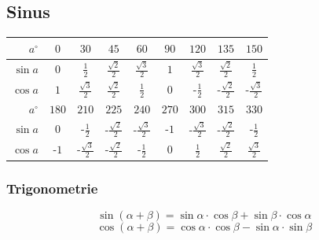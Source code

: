 \documentclass[8pt,a4paper,landscape]{scrartcl}
\begin{document}
\begin{multicols*}{3}
\subsection*{Sinus}
\begin{tabularx}{\columnwidth}{r|c|c|c|c|c|c|c|c|}
	$ a^\circ $ & $ 0 $ & $ 30 $ & $ 45 $ & $ 60 $ & $ 90 $ & $ 120 $ & $ 135 $ & $ 150 $ \\ \hline
	$ \sin a$& $ 0 $& $ \frac{1}{2} $& $ \frac{\sqrt{2}}{2} $& $ \frac{\sqrt{3}}{2} $& $ 1 $& $ \frac{\sqrt{3}}{2} $& $ \frac{\sqrt{2}}{2} $& $ \frac{1}{2} $\\ \hline
	$ \cos a$& $ 1 $& $ \frac{\sqrt{3}}{2} $& $ \frac{\sqrt{2}}{2} $& $ \frac{1}{2} $& $ 0 $& $ \text{-}\frac{1}{2} $& $ \text{-}\frac{\sqrt{2}}{2} $& $ \text{-}\frac{\sqrt{3}}{2} $ \\ \hline \hline
$ a^\circ $ & $ 180 $ & $ 210 $ & $ 225 $ & $ 240 $ & $ 270 $ & $ 300 $ & $ 315 $ & $ 330 $ \\ \hline
$ \sin a$& $ 0 $& $ \text{-}\frac{1}{2} $& $ \text{-}\frac{\sqrt{2}}{2} $& $ \text{-}\frac{\sqrt{3}}{2} $& $ \text{-}1 $& $ \text{-}\frac{\sqrt{3}}{2} $& $ \text{-}\frac{\sqrt{2}}{2} $& $ \text{-}\frac{1}{2} $\\ \hline
$ \cos a$& $ \text{-}1 $& $ \text{-}\frac{\sqrt{3}}{2} $& $ \text{-}\frac{\sqrt{2}}{2} $& $ \text{-}\frac{1}{2} $& $ 0 $& $ \frac{1}{2} $& $ \frac{\sqrt{2}}{2} $& $ \frac{\sqrt{3}}{2} $
\end{tabularx}

\subsubsection*{Trigonometrie}
$$ \sin(\alpha + \beta) = \sin\alpha \cdot \cos\beta + \sin\beta \cdot \cos\alpha $$
$$ \cos(\alpha + \beta) = \cos\alpha \cdot \cos\beta - \sin\alpha \cdot \sin\beta $$


\end{multicols*}
\end{document}
